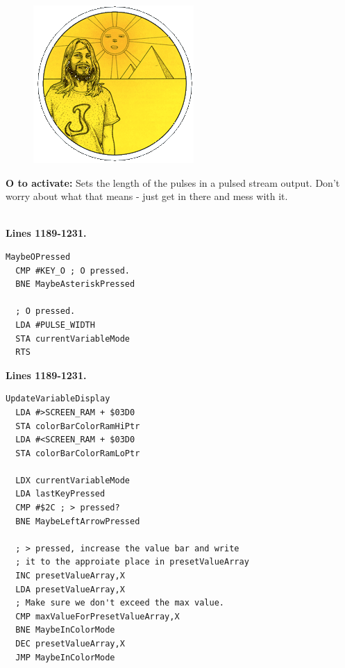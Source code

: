 \begin{definition}
\setlength{\intextsep}{0pt}%
\setlength{\columnsep}{3pt}%
\begin{figure}
\includegraphics[width=\linewidth]{src/callout/psych.png} 
\end{figure}
\small
\textbf{O to activate:} Sets the length of the pulses in a
pulsed stream output. Don’t worry about what that means - just get
in there and mess with it.
\\
\\
\end{definition}


\clearpage
\textbf{Lines 1189-1231. } 
\begin{lstlisting}[caption=From \icode{CheckKeyboardInput}.]
MaybeOPressed   
  CMP #KEY_O ; O pressed.
  BNE MaybeAsteriskPressed

  ; O pressed.
  LDA #PULSE_WIDTH
  STA currentVariableMode
  RTS 
\end{lstlisting}
\textbf{Lines 1189-1231. } 
\begin{lstlisting}[caption=From \icode{CheckKeyboardInputForActiveVariable}. Pressing the < and > keys increments and
decrements the value in presetValueArray pointed to by \icode{X}\, i.e. \icode{currentVariableMode}.]
UpdateVariableDisplay   
  LDA #>SCREEN_RAM + $03D0
  STA colorBarColorRamHiPtr
  LDA #<SCREEN_RAM + $03D0
  STA colorBarColorRamLoPtr

  LDX currentVariableMode
  LDA lastKeyPressed
  CMP #$2C ; > pressed?
  BNE MaybeLeftArrowPressed

  ; > pressed, increase the value bar and write
  ; it to the approiate place in presetValueArray
  INC presetValueArray,X
  LDA presetValueArray,X
  ; Make sure we don't exceed the max value.
  CMP maxValueForPresetValueArray,X
  BNE MaybeInColorMode
  DEC presetValueArray,X
  JMP MaybeInColorMode
\end{lstlisting}

